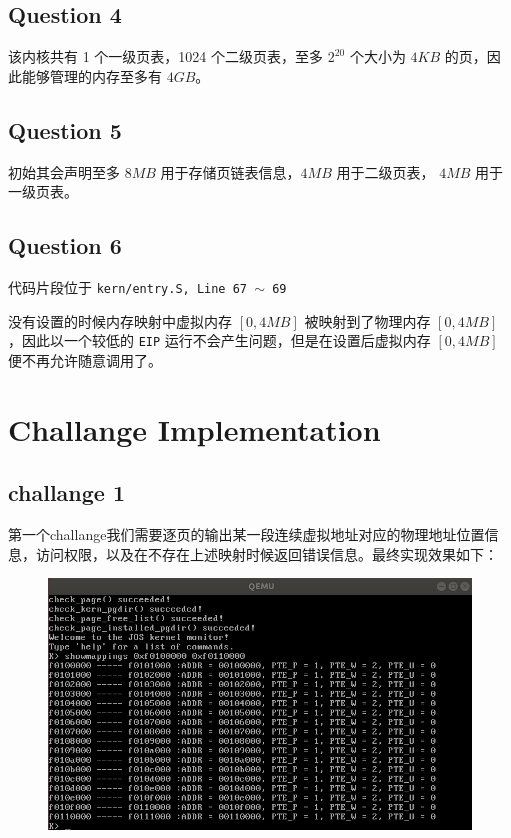 \documentclass[11pt]{article}
\begin{document}
	
	\subsection*{Question 4}
	
	\par 该内核共有 1 个一级页表，1024 个二级页表，至多 $2^20$ 个大小为 $4KB$ 的页，因此能够管理的内存至多有 $4GB$。
	
	\subsection*{Question 5}
	
	\par 初始其会声明至多 $8MB$ 用于存储页链表信息，$4MB$ 用于二级页表， $4MB$ 用于一级页表。 
	
	\subsection*{Question 6}
	
	\par 代码片段位于 \texttt{kern/entry.S, Line 67 $\sim$ 69}
	\par 没有设置的时候内存映射中虚拟内存 $[0,4MB]$ 被映射到了物理内存 $[0,4MB]$，因此以一个较低的 \texttt{EIP} 运行不会产生问题，但是在设置后虚拟内存 $[0,4MB]$ 便不再允许随意调用了。
	
	\section{Challange Implementation}
	
	\subsection*{challange 1}
	
	\par 第一个challange我们需要逐页的输出某一段连续虚拟地址对应的物理地址位置信息，访问权限，以及在不存在上述映射时候返回错误信息。最终实现效果如下：
	
	
\begin{figure}[htbp]
\centering
\includegraphics[width=0.7\linewidth]{lab2-cha1.png}
\end{figure}
\end{document}
